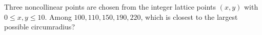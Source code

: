 Three noncollinear points are chosen from the integer lattice points $(x,y)$ with $0\le x,y\le10$. Among $100,110,150,190,220$, which is closest to the largest possible circumradius?
